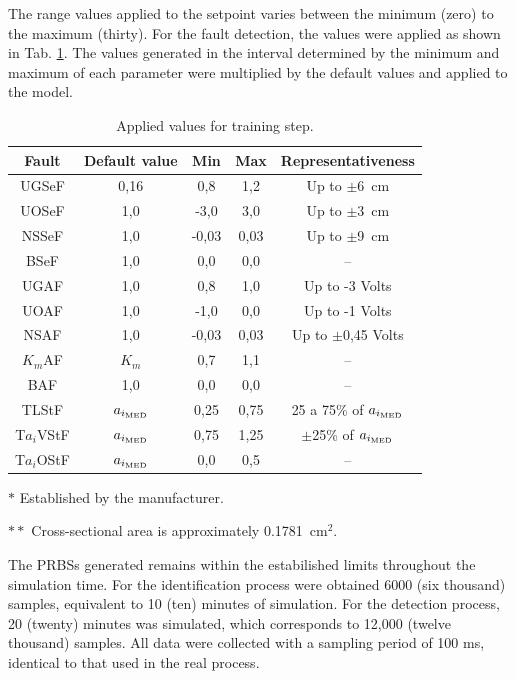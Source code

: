 \documentclass[10pt,fleqn,a4paper]{article}
\begin{document}
The range values applied to the setpoint varies between the minimum (zero) to
the maximum (thirty). For the fault detection, the values were applied as shown
in Tab. \ref{tab:values}. The values generated in the interval determined by the
minimum and maximum of each parameter were multiplied by the default values and
applied to the model.

\begin{table}[htb]
\caption{Applied values for training step.}
\label{tab:values}
\centering
\begin{threeparttable}
\begin{tabular}{|c|c|c|c|c|}
\hline
{\bf Fault} & {\bf Default value} & {\bf Min} & {\bf Max} & 
{\bf Representativeness}\\
\hline
UGSeF & 0,16\tnote{$*$} & 
0,8 & 1,2 & Up to $\pm$6\ cm\\
\hline
UOSeF & 1,0 & -3,0 & 3,0 & Up to $\pm$3\ cm\\
\hline
NSSeF & 1,0 & -0,03 & 0,03 & Up to $\pm$9\ cm\\
\hline
BSeF & 1,0 & 0,0 & 0,0 & -- \\
\hline
UGAF & 1,0 & 0,8 & 1,0 & Up to -3 Volts\\
\hline
UOAF & 1,0 & -1,0 & 0,0 & Up to -1 Volts\\
\hline
NSAF & 1,0 & -0,03 & 0,03 & Up to $\pm$0,45 Volts\\
\hline
$K_m$AF & $K_m$ & 0,7 & 1,1 & --\\
\hline
BAF & 1,0 & 0,0 & 0,0 & --\\
\hline
TLStF & $a_{i_{\text{\tiny MED}}}$\tnote{$**$} & 
0,25 & 0,75 & 25 a 75\% of $a_{i_{\text{\tiny MED}}}$\\
\hline
T$a_i$VStF & $a_{i_{\text{\tiny MED}}}$ & 
0,75 & 1,25 & $\pm$25\% of $a_{i_{\text{\tiny MED}}}$\\
\hline
T$a_i$OStF & $a_{i_{\text{\tiny MED}}}$ & 
0,0 & 0,5 & --\\
\hline
\end{tabular}
\begin{tablenotes}
\item [$*$] Established by the manufacturer.
\item [$**$] Cross-sectional area is approximately 0.1781\ cm${}^2$.
\end{tablenotes}
\end{threeparttable}
\end{table}

The PRBSs generated remains within the estabilished limits throughout the
simulation time. For the identification process were obtained 6000 (six
thousand) samples, equivalent to 10 (ten) minutes of simulation. For the
detection process, 20 (twenty) minutes was simulated, which corresponds to
12,000 (twelve thousand) samples. All data were collected with a sampling period
of 100 ms, identical to that used in the real process.
\end{document}
